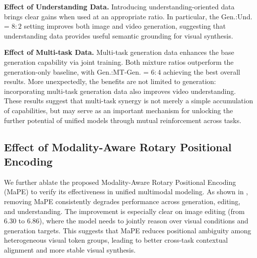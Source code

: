 \documentclass{llmxive}
\begin{document}
\textbf{Effect of Understanding Data.}
Introducing understanding-oriented data brings clear gains when used at an appropriate ratio. In particular, the Gen.:Und. = $8:2$ setting improves both image and video generation, suggesting that understanding data provides useful semantic grounding for visual synthesis. 

\textbf{Effect of Multi-task Data.}
Multi-task generation data enhances the base generation capability via joint training. Both mixture ratios outperform the generation-only baseline, with Gen.:MT-Gen. = $6:4$ achieving the best overall results. 
More unexpectedly, the benefits are not limited to generation: incorporating multi-task generation data also improves video understanding.
These results suggest that multi-task synergy is not merely a simple accumulation of capabilities, but may serve as an important mechanism for unlocking the further potential of unified models through mutual reinforcement across tasks.



\subsection{Effect of Modality-Aware Rotary Positional Encoding}

We further ablate the proposed Modality-Aware Rotary Positional Encoding (MaPE) to verify its effectiveness in unified multimodal modeling. As shown in , removing MaPE consistently degrades performance across generation, editing, and understanding. 
The improvement is especially clear on image editing (from $6.30$ to $6.86$), where the model needs to jointly reason over visual conditions and generation targets. This suggests that MaPE reduces positional ambiguity among heterogeneous visual token groups, leading to better cross-task contextual alignment and more stable visual synthesis.
\end{document}
